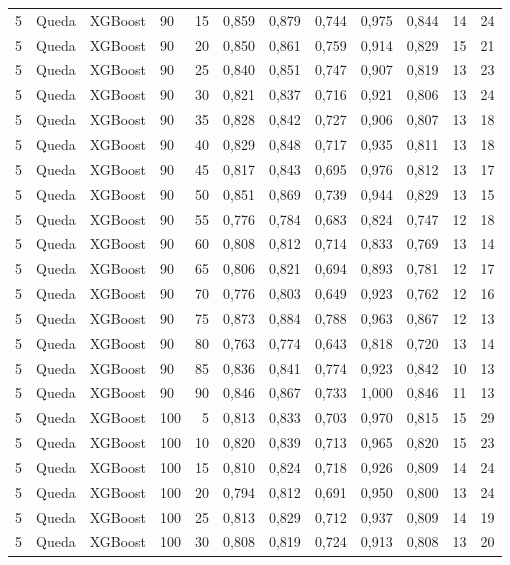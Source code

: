 \begin{longtable}{ccclrrrrrrrr}
5 & Queda & XGBoost & 90 & 15 & 0,859 & 0,879 & 0,744 & 0,975 & 0,844 & 14 & 24 \\
5 & Queda & XGBoost & 90 & 20 & 0,850 & 0,861 & 0,759 & 0,914 & 0,829 & 15 & 21 \\
5 & Queda & XGBoost & 90 & 25 & 0,840 & 0,851 & 0,747 & 0,907 & 0,819 & 13 & 23 \\
5 & Queda & XGBoost & 90 & 30 & 0,821 & 0,837 & 0,716 & 0,921 & 0,806 & 13 & 24 \\
5 & Queda & XGBoost & 90 & 35 & 0,828 & 0,842 & 0,727 & 0,906 & 0,807 & 13 & 18 \\
5 & Queda & XGBoost & 90 & 40 & 0,829 & 0,848 & 0,717 & 0,935 & 0,811 & 13 & 18 \\
5 & Queda & XGBoost & 90 & 45 & 0,817 & 0,843 & 0,695 & 0,976 & 0,812 & 13 & 17 \\
5 & Queda & XGBoost & 90 & 50 & 0,851 & 0,869 & 0,739 & 0,944 & 0,829 & 13 & 15 \\
5 & Queda & XGBoost & 90 & 55 & 0,776 & 0,784 & 0,683 & 0,824 & 0,747 & 12 & 18 \\
5 & Queda & XGBoost & 90 & 60 & 0,808 & 0,812 & 0,714 & 0,833 & 0,769 & 13 & 14 \\
5 & Queda & XGBoost & 90 & 65 & 0,806 & 0,821 & 0,694 & 0,893 & 0,781 & 12 & 17 \\
5 & Queda & XGBoost & 90 & 70 & 0,776 & 0,803 & 0,649 & 0,923 & 0,762 & 12 & 16 \\
5 & Queda & XGBoost & 90 & 75 & 0,873 & 0,884 & 0,788 & 0,963 & 0,867 & 12 & 13 \\
5 & Queda & XGBoost & 90 & 80 & 0,763 & 0,774 & 0,643 & 0,818 & 0,720 & 13 & 14 \\
5 & Queda & XGBoost & 90 & 85 & 0,836 & 0,841 & 0,774 & 0,923 & 0,842 & 10 & 13 \\
5 & Queda & XGBoost & 90 & 90 & 0,846 & 0,867 & 0,733 & 1,000 & 0,846 & 11 & 13 \\
5 & Queda & XGBoost & 100 & 5 & 0,813 & 0,833 & 0,703 & 0,970 & 0,815 & 15 & 29 \\
5 & Queda & XGBoost & 100 & 10 & 0,820 & 0,839 & 0,713 & 0,965 & 0,820 & 15 & 23 \\
5 & Queda & XGBoost & 100 & 15 & 0,810 & 0,824 & 0,718 & 0,926 & 0,809 & 14 & 24 \\
5 & Queda & XGBoost & 100 & 20 & 0,794 & 0,812 & 0,691 & 0,950 & 0,800 & 13 & 24 \\
5 & Queda & XGBoost & 100 & 25 & 0,813 & 0,829 & 0,712 & 0,937 & 0,809 & 14 & 19 \\
5 & Queda & XGBoost & 100 & 30 & 0,808 & 0,819 & 0,724 & 0,913 & 0,808 & 13 & 20 \\

\end{longtable}
